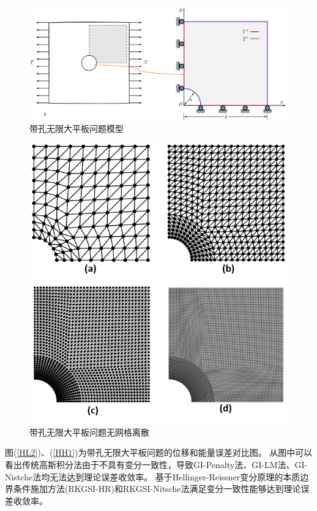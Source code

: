 \begin{figure}[!h]
\centering
\includegraphics[scale=0.5]{figure/hole.png}
    \caption{带孔无限大平板问题模型}\label{hole}
\end{figure}
\begin{figure}[!h]
\centering
 \includegraphics{figure/hole.msh.png}
   \caption{带孔无限大平板问题无网格离散}\label{hole.msh}
\end{figure}\newpage
图(\ref{HL2})、(\ref{HH1})为带孔无限大平板问题的位移和能量误差对比图。
从图中可以看出传统高斯积分法由于不具有变分一致性，导致GI-Penalty法、GI-LM法、GI-Nistche法均无法达到理论误差收敛率。
基于Hellinger-Reissner变分原理的本质边界条件施加方法(RKGSI-HR)和RKGSI-Nitsche法满足变分一致性能够达到理论误差收敛率。
